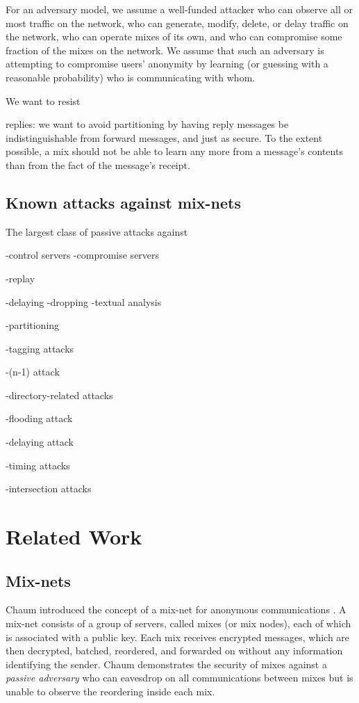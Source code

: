 \documentclass[11pt]{IEEEtran}
\begin{document}
For an adversary model, we assume a well-funded attacker who can
observe all or most traffic on the network, who can generate, modify,
delete, or delay traffic on the network, who can operate mixes of its
own, and who can compromise some fraction of the mixes on the network.
We assume that such an adversary is attempting to compromise users'
anonymity by learning (or guessing with a reasonable probability) who
is communicating with whom.

We want to resist

replies: we want to avoid partitioning by having reply messages be
   indistinguishable from forward messages, and just as secure.  To the
   extent possible, a mix should not be able to learn any more from a
   message's contents than from the fact of the message's receipt.


\subsection{Known attacks against mix-nets}

The largest class of passive attacks against 

-control servers
-compromise servers

-replay

-delaying
-dropping
-textual analysis

-partitioning

-tagging attacks

-(n-1) attack

-directory-related attacks

-flooding attack

-delaying attack

-timing attacks

-intersection attacks


\section{Related Work}
\label{sec:related}

\subsection{Mix-nets}

Chaum introduced the concept of a mix-net for anonymous communications
\cite{chaum-mix}. A mix-net consists of a group of servers, called
mixes (or mix nodes), each of which is associated with a public
key. Each mix receives encrypted messages, which are then decrypted,
batched, reordered, and forwarded on without any information
identifying the sender. Chaum demonstrates the security of mixes
against a \emph{passive adversary} who can eavesdrop on all
communications between mixes but is unable to observe the reordering
inside each mix.
\end{document}
